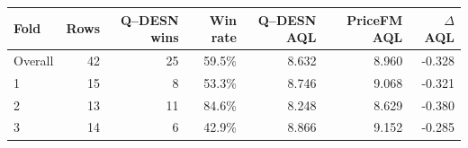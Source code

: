 \begin{tabular}{lrrrrrr}
\toprule
Fold & Rows & Q--DESN wins & Win rate & Q--DESN AQL & PriceFM AQL & $\Delta$ AQL
\\
\midrule
Overall & 42 & 25 & 59.5\% & 8.632 & 8.960 & -0.328
\\
1 & 15 & 8 & 53.3\% & 8.746 & 9.068 & -0.321
\\
2 & 13 & 11 & 84.6\% & 8.248 & 8.629 & -0.380
\\
3 & 14 & 6 & 42.9\% & 8.866 & 9.152 & -0.285
\\
\bottomrule
\end{tabular}
